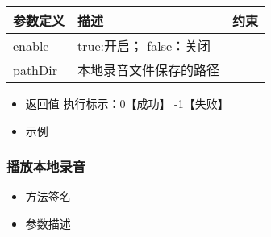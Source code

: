 \documentclass[letterpaper,10pt,english]{sphinxmanual}
\begin{document}
\begin{savenotes}\sphinxattablestart
\centering
\begin{tabulary}{\linewidth}[t]{|T|T|T|}
\hline
\sphinxstyletheadfamily 
参数定义
&\sphinxstyletheadfamily 
描述
&\sphinxstyletheadfamily 
约束
\\
\hline
enable
&
true:开启； false：关闭
&
\textendash{}
\\
\hline
pathDir
&
本地录音文件保存的路径
&
\textendash{}
\\
\hline
\end{tabulary}
\par
\sphinxattableend\end{savenotes}
\begin{itemize}
\item {} 
返回值 执行标示：0【成功】 -1【失败】

\item {} 
示例

\end{itemize}

%
\begin{sphinxVerbatim}[commandchars=\\\{\}]
   
\end{sphinxVerbatim}


\subsubsection{播放本地录音}
\label{\detokenize{csharp:id80}}\begin{itemize}
\item {} 
方法签名

\end{itemize}

%
\begin{sphinxVerbatim}[commandchars=\\\{\}]
   
\end{sphinxVerbatim}
\begin{itemize}
\item {} 
参数描述

\end{itemize}
\end{document}
